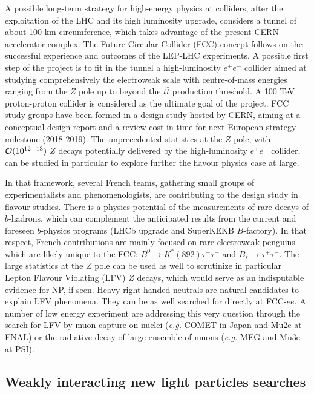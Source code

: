 A possible long-term strategy for high-energy physics at colliders, after the exploitation of the LHC and its high luminosity upgrade, considers a tunnel of about 100 km circumference, which takes advantage of the present CERN accelerator complex. The Future Circular Collider (FCC) concept follows on the successful experience and outcomes of the LEP-LHC  experiments. A possible first step of the project is to fit in the tunnel a high-luminosity $e^+e^-$ collider aimed at studying comprehensively the electroweak scale with centre-of-mass energies ranging from the $Z$ pole up to beyond the $t \bar t$ production threshold. A  100 TeV proton-proton collider is considered as the ultimate goal of the project.  
FCC study groups have been formed in a design study hosted by CERN, aiming at a conceptual design report and a review cost in time for next European strategy milestone (2018-2019). The unprecedented statistics at the $Z$ pole, with ${\cal O}(10^{12-13})$ $Z$ decays potentially delivered by the high-luminosity $e^+e^-$ collider, can be studied in particular to explore further the flavour physics case at large.  

In that framework, several French teams, gathering small groups of experimentalists and phenomenologists, are contributing to the design study in flavour studies.  
There is a physics potential of the measurements of rare decays of $b$-hadrons, which can complement  the anticipated results from the current and foreseen $b$-physics programs (LHCb upgrade and SuperKEKB $B$-factory). In that respect, French contributions are mainly focused on rare electroweak penguins which are likely unique to the FCC: $B^0 \to K^*(892) \tau^+\tau^-$ and $B_s \to \tau^+ \tau^-$.   
The large statistics at the $Z$ pole can be used as well to scrutinize in particular Lepton Flavour Violating (LFV) $Z$ decays, which would serve as an indisputable evidence for NP, if seen. Heavy right-handed neutrals are natural candidates to explain LFV phenomena. They can be as well searched for directly at FCC-$ee$. A number of low energy experiment are addressing this very question through the search for LFV by muon capture on nuclei ({\it e.g.} COMET in Japan and Mu2e at FNAL) or the radiative decay of large ensemble of muons ({\it e.g.} MEG and Mu3e at PSI). 



\subsection*{Weakly interacting new light particles searches}

